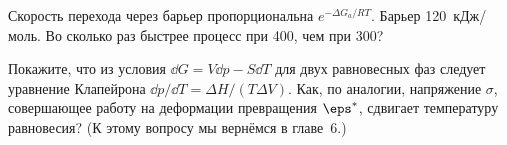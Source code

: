 \begin{exercise}
Скорость перехода через барьер пропорциональна $e^{-\Delta G_a/RT}$. Барьер 120~кДж/моль. Во сколько раз быстрее
процесс при 400\degC, чем при 300\degC?
\end{exercise}

\begin{exercise}
Покажите, что из условия $\dd G = V\dd p - S\dd T$ для двух равновесных фаз следует уравнение Клапейрона
$\dd p/\dd T = \Delta H/(T\Delta V)$. Как, по аналогии, напряжение $\sigma$, совершающее работу на деформации
превращения $\eps^*$, сдвигает температуру равновесия? (К этому вопросу мы вернёмся в главе~6.)
\end{exercise}
